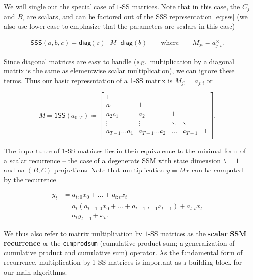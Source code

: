 We will single out the special case of $1$-SS matrices. Note that in this case, the $C_j$ and $B_i$ are scalars, and can be factored out of the SSS representation \eqref{eq:sss}
(we also use lower-case to emphasize that the parameters are scalars in this case)

\begin{align*}
  \mathsf{SSS}(a, b, c) = \mathsf{diag}(c) \cdot M \cdot \mathsf{diag}(b) \qquad \text{where} \qquad M_{ji} = a_{j:i}^\times
  .
\end{align*}

Since diagonal matrices are easy to handle (e.g.\ multiplication by a diagonal matrix is the same as elementwise scalar multiplication), we can ignore these terms. Thus our basic representation of a 1-SS matrix is $M_{ji} = a_{j:i}$ or

\begin{equation}
  \label{eq:1ss}
  M =
  \mathsf{1SS}(a_{0:T}) \coloneqq
  \begin{bmatrix}
    1 & \\
    a_1 & 1 & \\
    a_2a_1 & a_2 & 1 \\
    \vdots & \vdots & \ddots & \ddots \\
    a_{T-1}\dots a_1 & a_{T-1}\dots a_2 & \dots & a_{T-1} & 1 \\
  \end{bmatrix}
  .
\end{equation}

The importance of 1-SS matrices lies in their equivalence to the minimal form of a scalar recurrence -- the case of a degenerate SSM with state dimension $\mathtt{N}=1$ and no $(B, C)$ projections. Note that multiplication $y = Mx$ can be computed by the recurrence

\begin{equation}
  \label{eq:1ss-recurrence}
  \begin{aligned}
    y_t &= a_{t:0}x_0 + \dots + a_{t:t}x_t \\
        &= a_t \left(a_{t-1:0}x_0 + \dots + a_{t-1:t-1}x_{t-1}\right) + a_{t:t}x_t \\
        &= a_t y_{t-1} + x_t
        .
  \end{aligned}
\end{equation}

We thus also refer to matrix multiplication by $1$-SS matrices as the \textbf{scalar SSM recurrence} or the \texttt{cumprodsum} (cumulative product sum; a generalization of cumulative product and cumulative sum) operator. As the fundamental form of recurrence, multiplication by 1-SS matrices is important as a building block for our main algorithms.

